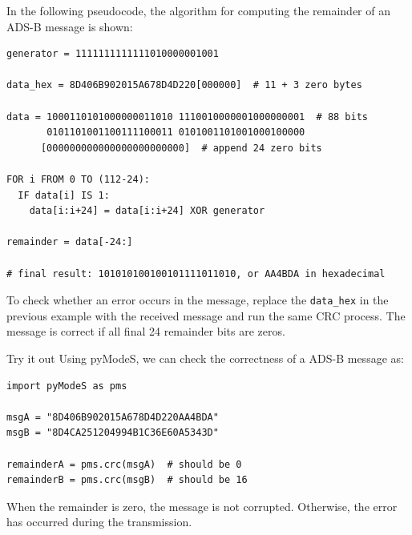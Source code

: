 In the following pseudocode, the algorithm for computing the remainder of an ADS-B message is shown:

\begin{verbatim}
generator = 1111111111111010000001001

data_hex = 8D406B902015A678D4D220[000000]  # 11 + 3 zero bytes

data = 1000110101000000011010 1110010000001000000001  # 88 bits
       0101101001100111100011 0101001101001000100000
      [000000000000000000000000]  # append 24 zero bits

FOR i FROM 0 TO (112-24):
  IF data[i] IS 1:
    data[i:i+24] = data[i:i+24] XOR generator

remainder = data[-24:]

# final result: 101010100100101111011010, or AA4BDA in hexadecimal
\end{verbatim}

To check whether an error occurs in the message, replace the \texttt{data\_hex} in the previous example with the received message and run the same CRC process. The message is correct if all final 24 remainder bits are zeros.

\begin{notebox}{Try it out}
Using pyModeS, we can check the correctness of a ADS-B message as: 

\begin{verbatim}
import pyModeS as pms

msgA = "8D406B902015A678D4D220AA4BDA"
msgB = "8D4CA251204994B1C36E60A5343D"

remainderA = pms.crc(msgA)  # should be 0
remainderB = pms.crc(msgB)  # should be 16
\end{verbatim}

When the remainder is zero, the message is not corrupted. Otherwise, the error has occurred during the transmission.
\end{notebox}